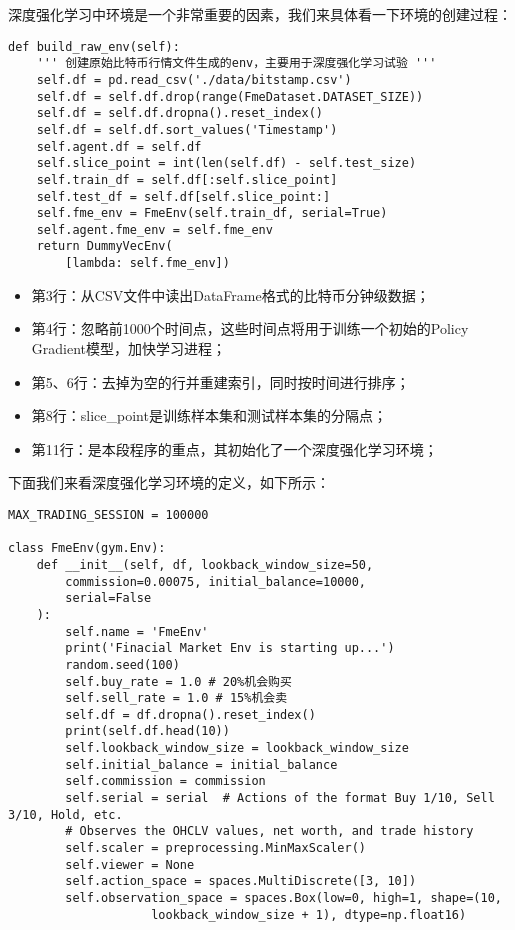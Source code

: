 \documentclass{article}
\begin{document}
深度强化学习中环境是一个非常重要的因素，我们来具体看一下环境的创建过程：
\begin{lstlisting}
def build_raw_env(self):
    ''' 创建原始比特币行情文件生成的env，主要用于深度强化学习试验 '''
    self.df = pd.read_csv('./data/bitstamp.csv')
    self.df = self.df.drop(range(FmeDataset.DATASET_SIZE))
    self.df = self.df.dropna().reset_index()
    self.df = self.df.sort_values('Timestamp')
    self.agent.df = self.df
    self.slice_point = int(len(self.df) - self.test_size)
    self.train_df = self.df[:self.slice_point]
    self.test_df = self.df[self.slice_point:]
    self.fme_env = FmeEnv(self.train_df, serial=True)
    self.agent.fme_env = self.fme_env
    return DummyVecEnv(
        [lambda: self.fme_env])
\end{lstlisting}
\begin{itemize}
\item 第3行：从CSV文件中读出DataFrame格式的比特币分钟级数据；
\item 第4行：忽略前1000个时间点，这些时间点将用于训练一个初始的Policy Gradient模型，加快学习进程；
\item 第5、6行：去掉为空的行并重建索引，同时按时间进行排序；
\item 第8行：slice\_point是训练样本集和测试样本集的分隔点；
\item 第11行：是本段程序的重点，其初始化了一个深度强化学习环境；
\end{itemize}
下面我们来看深度强化学习环境的定义，如下所示：
\begin{lstlisting}
MAX_TRADING_SESSION = 100000

class FmeEnv(gym.Env):
    def __init__(self, df, lookback_window_size=50,
        commission=0.00075, initial_balance=10000,
        serial=False
    ):
        self.name = 'FmeEnv'
        print('Finacial Market Env is starting up...')
        random.seed(100)
        self.buy_rate = 1.0 # 20%机会购买
        self.sell_rate = 1.0 # 15%机会卖
        self.df = df.dropna().reset_index()
        print(self.df.head(10))
        self.lookback_window_size = lookback_window_size
        self.initial_balance = initial_balance
        self.commission = commission
        self.serial = serial  # Actions of the format Buy 1/10, Sell 3/10, Hold, etc.
        # Observes the OHCLV values, net worth, and trade history
        self.scaler = preprocessing.MinMaxScaler()
        self.viewer = None
        self.action_space = spaces.MultiDiscrete([3, 10])
        self.observation_space = spaces.Box(low=0, high=1, shape=(10, 
                    lookback_window_size + 1), dtype=np.float16)
\end{lstlisting}
\end{document}
